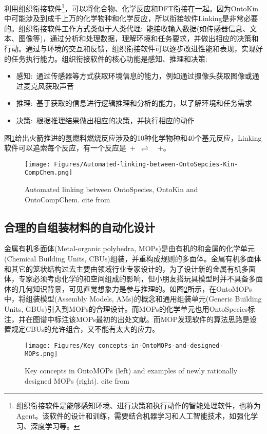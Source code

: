 利用组织衔接软件\footnote{组织衔接软件是能够感知环境、进行决策和执行动作的智能处理软件，也称为\textrm{Agent}。该软件的设计和训练，需要结合机器学习和人工智能技术，如强化学习、深度学习等。}，可以将化合物、化学反应和\textrm{DFT}衔接在一起。因为\textrm{OntoKin}中可能涉及到成千上万的化学物种和化学反应，所以衔接软件\textrm{Linking}是非常必要的。组织衔接软件工作方式类似于人类代理:~能接收输入数据(如传感器信息、文本、图像等)，通过分析和处理数据，理解环境和任务要求，并做出相应的决策和行动。通过与环境的交互和反馈，组织衔接软件可以逐步改进性能和表现，实现好的任务执行能力。组织衔接软件的核心功能是感知、推理和决策:
\begin{itemize}
	\item 感知:~通过传感器等方式获取环境信息的能力，例如通过摄像头获取图像或通过麦克风获取声音
	\item 推理:~基于获取的信息进行逻辑推理和分析的能力，以了解环境和任务需求
	\item 决策:~根据推理结果做出相应的决策，并执行相应的动作 
\end{itemize}
图\ref{Fig:Automated-linking-between-OntoSpecies-Kin-CompChem}给出火箭推进的氢燃料燃烧反应涉及的10种化学物种和40个基元反应，\textrm{Linking}软件可以追索每个反应，有一个反应是~+~$\rightleftharpoons$~~+。
\begin{figure}[h!]
\centering
\texttt{[image: Figures/Automated-linking-between-OntoSepcies-Kin-CompChem.png]}
\caption{\small\textrm{Automated linking between OntoSpecies, OntoKin and OntoCompChem. cite from\cite{ACR56-128_2023}}}%
\label{Fig:Automated-linking-between-OntoSpecies-Kin-CompChem}
\end{figure}
\subsection{合理的自组装材料的自动化设计}
金属有机多面体\textrm{(Metal-organic polyhedra, MOPs)}是由有机的和金属的化学单元\textrm{(Chemical Building Units, CBUs)}组装，并重构成规则的多面体。金属有机多面体和其它的笼状结构过去主要由领域行业专家设计的，为了设计新的金属有机多面体，专家必须考虑化学的和空间组成的影响，但小朋友搭玩具模型时并不具备多面体的几何知识背景，可见直觉想象力是参与推理的。如图\ref{Fig:OntoMOPs-MOPs}所示，在\textrm{OntoMOPs}中，将组装模型\textrm{(Assembly Models, AMs)}的概念和通用组装单元\textrm{(Generic Building Units, GBUs)}引入到\textrm{MOPs}的合理设计。而\textrm{MOPs}的化学单元也用\textrm{OntoSpecies}标注，并在图谱中标注该\textrm{MOPs}最初的出处文献。而\textrm{MOP}发现软件的算法思路是设置规定\textrm{CBUs}的允许组合，又不能有太大的应力。
\begin{figure}[h!]
\centering
\texttt{[image: Figures/Key\_concepts-in-OntoMOPs-and-designed-MOPs.png]}
\caption{\small\textrm{Key concepts in OntoMOPs (left) and examples of newly rationally designed MOPs (right). cite from\cite{ACR56-128_2023}}}%
\label{Fig:OntoMOPs-MOPs}
\end{figure}
